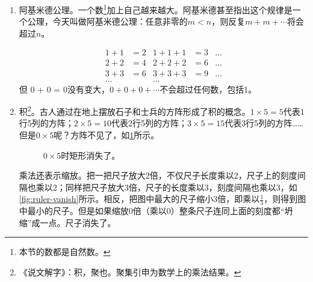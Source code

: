 \documentclass[b5paper]{ctexart}
\begin{document}
\label{sec:archimedes-axiom}
\begin{enumerate}[1)]
\item 阿基米德公理。一个数\footnote{本节的数都是自然数。}加上自己越来越大。阿基米德甚至指出这个规律是一个公理，今天叫做阿基米德公理：任意非零的$m < n$，则反复$m + m + \cdots$将会超过$n$。 

\begin{align*}
1 + 1 &= 2   & 1 + 1 + 1 &= 3 & \dots \\
2 + 2 &= 4   & 2 + 2 + 2 &= 6 & \dots \\
3 + 3 &= 6   & 3 + 3 + 3 &= 9 & \dots \\
\dots &      & \dots     &    &
\end{align*}
但 0 + 0 = 0没有变大，$0 + 0 + 0 + \cdots$不会超过任何数，包括1。

\item 积\footnote{《说文解字》：积，聚也。聚集引申为数学上的乘法结果。}。古人通过在地上摆放石子和士兵的方阵形成了积的概念。$1 \times 5 = 5$代表1行5列的方阵；$2 \times 5 = 10$代表2行5列的方阵；$3 \times 5 = 15$代表3行5列的方阵……但是$0 \times 5$呢？方阵不见了，如\cref{fig:grid-vanish}所示。

\begin{figure}[htbp]
 \centering

 \caption{$0 \times 5$时矩形消失了。}
 \label{fig:grid-vanish}
\end{figure}

\label{sec:mul-as-zoom}
乘法还表示缩放。把一把尺子放大2倍，不仅尺子长度乘以2，尺子上的刻度间隔也乘以2；同样把尺子放大3倍，尺子的长度乘以3，刻度间隔也乘以3，如\cref{fig:ruler-vanish}所示。相反，把图中最大的尺子缩小3倍，即乘以$\frac{1}{3}$，则得到图中最小的尺子。但是如果缩放0倍（乘以0）整条尺子连同上面的刻度都“坍缩”成一点。尺子消失了。


\end{enumerate}
\end{document}
